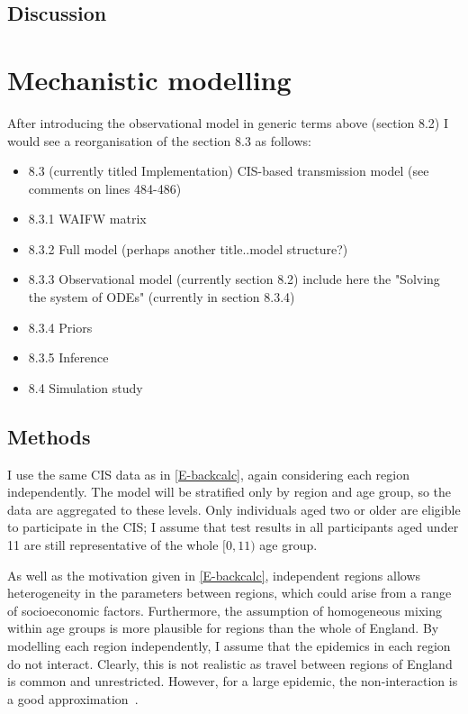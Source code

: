 \documentclass[thesis.tex]{subfiles}
\begin{document}
\subsection{Discussion} \label{backcalc:sec:discussion}

\section{Mechanistic modelling}

{\color{red} After introducing the observational model in generic terms above (section 8.2) I would see a reorganisation of the section 8.3 as follows:   
\begin{itemize}
    \item 8.3 (currently  titled Implementation) CIS-based transmission model (see comments on lines 484-486) 
\item 8.3.1 WAIFW matrix
\item 8.3.2 Full model (perhaps another title..model structure?) 
\item 8.3.3 Observational model (currently section 8.2) include here the "Solving the system of ODEs" (currently in section 8.3.4)
\item 8.3.4 Priors 
\item 8.3.5 Inference 
\item 8.4 Simulation study
\end{itemize}
}


\subsection{Methods}

I use the same CIS data as in \cref{E-backcalc}, again considering each region independently.
The model will be stratified only by region and age group, so the data are aggregated to these levels.
Only individuals aged two or older are eligible to participate in the CIS; I assume that test results in all participants aged under 11 are still representative of the whole $[0, 11)$ age group.

As well as the motivation given in \cref{E-backcalc}, independent regions allows heterogeneity in the parameters between regions, which could arise from a range of socioeconomic factors.
Furthermore, the assumption of homogeneous mixing within age groups is more plausible for regions than the whole of England.
By modelling each region independently, I assume that the epidemics in each region do not interact.
Clearly, this is not realistic as travel between regions of England is common and unrestricted.
However, for a large epidemic, the non-interaction is a good approximation~\autocite{birrellRealtimea}.
\end{document}
